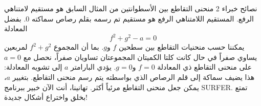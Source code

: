 \begin{surferPage}{نصائح خبراء 2}
منحنى التقاطع بين الأسطوانتين من المثال السابق هو مستقيم لامتناهي الرفع. المستقيم اللامتناهي الرفع هو مستقيم تم رسمه بقلم رصاص سماكته 0. بفضل المعادلة
\[ f^2+g^2-a=0\]
يمكننا حسب منحنيات التقاطع بين سطحين $f$ و$g$. بما أن المجموع $f^2+g^2$ لمربعين يساوي صفراً في حال كانت كلتا الكميتان المجموعتان تساويان صفراً، نحصل مع $ a=0 $ على منحنى التقاطع ذي المعادلة $ f=0 $ و$ g=0 $.
يؤدي البارامتر $ a $ إلى تشويه المعادلة: هذا يضيف سماكة إلى قلم الرصاص الذي بواسطته يتم رسم منحنى التقاطع. بتغيير $ a $، يمكن جعل منحنى التقاطع مرئياً أكثر.
\newline \newline
تهانينا، أنت الآن خبير ببرنامج SURFER. تمتع بخلق واختراع أشكال جديدة!
\end{surferPage}